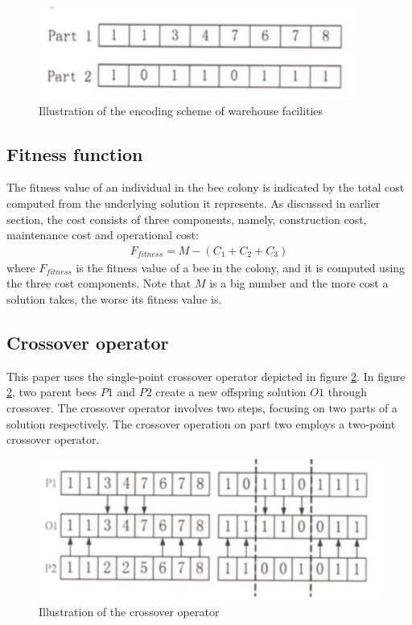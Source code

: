 \begin{figure}[h!]
	\begin{center}
		\includegraphics[width=0.5\linewidth]{sections/figure1.jpg}
		\caption{Illustration of the encoding scheme of warehouse facilities}
		\label{fig:fig1}
	\end{center}
\end{figure}

\subsection{Fitness function}
The fitness value of an individual in the bee colony is indicated by the total cost computed from the underlying solution it represents.
As discussed in earlier section, the cost consists of three components, namely, construction cost, maintenance cost and operational cost:
\begin{align}
	F_{fitness} = M - (C_1 + C_2 + C_3)
\end{align}
where $F_{fitness}$ is the fitness value of a bee in the colony, and it is computed using the three cost components.
Note that $M$ is a big number and the more cost a solution takes, the worse its fitness value is.

\subsection{Crossover operator}
This paper uses the single-point crossover operator depicted in figure \ref{fig:fig2}.
In figure \ref{fig:fig2}, two parent bees $P1$ and $P2$ create a new offspring solution $O1$ through crossover.
The crossover operator involves two steps, focusing on two parts of a solution respectively.
The crossover operation on part two employs a two-point crossover operator.

\begin{figure}[h!]
	\begin{center}
		\includegraphics[width=0.5\linewidth]{sections/figure2.jpg}
		\caption{Illustration of the crossover operator}
		\label{fig:fig2}
	\end{center}
\end{figure}

